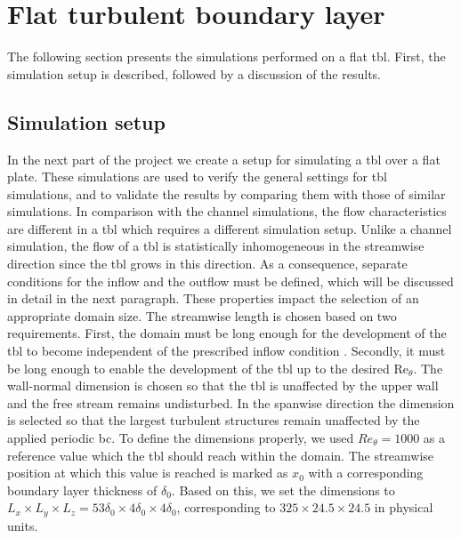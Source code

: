 \section{Flat turbulent boundary layer}\label{sec:flatTBL}

The following section presents the simulations performed on a flat \acrshort{tbl}.
First, the simulation setup is described, followed by a discussion of the results.


\subsection{Simulation setup} \label{subsec:flatTBLSetup}

In the next part of the project we create a setup for simulating a \acrshort{tbl} over a flat plate.
These simulations are used to verify the general settings for \acrshort{tbl} simulations, and to validate the results by comparing them with those of similar simulations.
In comparison with the channel simulations, the flow characteristics are different in a \acrshort{tbl} which requires a different simulation setup.
Unlike a channel simulation, the flow of a \acrshort{tbl} is statistically inhomogeneous in the streamwise direction since the \acrshort{tbl} grows in this direction.
As a consequence, separate conditions for the inflow and the outflow must be defined, which will be discussed in detail in the next paragraph.
These properties impact the selection of an appropriate domain size.
The streamwise length is chosen based on two requirements.
First, the domain must be long enough for the development of the \acrshort{tbl} to become independent of the prescribed inflow condition \citep{schlatter_turbulent_2012}.
Secondly, it must be long enough to enable the development of the \acrshort{tbl} up to the desired $\mathrm{Re}_{\theta}$.
The wall-normal dimension is chosen so that the \acrshort{tbl} is unaffected by the upper wall and the free stream remains undisturbed.
In the spanwise direction the dimension is selected so that the largest turbulent structures remain unaffected by the applied periodic \acrlong{bc}.
To define the dimensions properly, we used $Re_{\theta} = 1000$ as a reference value which the \acrshort{tbl} should reach within the domain.
The streamwise position at which this value is reached is marked as $x_0$ with a corresponding boundary layer thickness of $\delta_0$.
Based on this, we set the dimensions to $L_x \times L_y \times L_z = 53\delta_{0} \times 4\delta_{0} \times 4\delta_{0}$, corresponding to $325 \times 24.5 \times 24.5$ in physical units.
